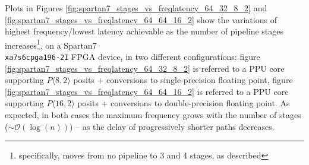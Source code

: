 \newpage
Plots in Figures \ref{fig:spartan7_stages_vs_freqlatency_64_32_8_2} and \ref{fig:spartan7_stages_vs_freqlatency_64_64_16_2} show the variations of highest frequency/lowest latency achievable as the number of pipeline stages increases\footnote{specifically, moves from no pipeline to 3 and 4 stages, as described}, on a Spartan7 \\\texttt{xa7s6cpga196-2I} FPGA device, in two different configurations: figure \ref{fig:spartan7_stages_vs_freqlatency_64_32_8_2} is referred to a  PPU core supporting $P\langle8,2\rangle$ posits + conversions to single-precision floating point, figure \ref{fig:spartan7_stages_vs_freqlatency_64_64_16_2} is referred to a PPU core supporting $P\langle16,2\rangle$ posits + conversions to double-precision floating point.
As expected, in both cases the maximum frequency grows with the number of stages ($\sim \mathcal{O}(\log(n))$) -- as the delay of progressively shorter paths decreases.





